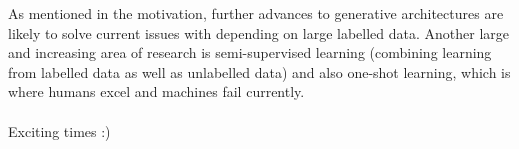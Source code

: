 \documentclass[twoside,11pt,a4paper]{article}
\theoremstyle{break}
\begin{document}
As mentioned in the motivation, further advances to generative architectures are
likely to solve current issues with depending on large labelled data.
Another large and increasing area of research is semi-supervised learning
(combining learning from labelled data as well as unlabelled data)
and also one-shot learning, which is where humans excel and machines fail currently.
\\\\
Exciting times :)



\end{document}
